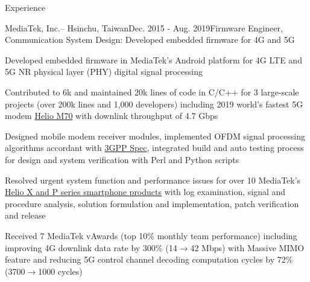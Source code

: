 \documentclass{resume} %
\begin{document}
\begin{rSection}{Experience}
\begin{rSubsection}{MediaTek, Inc.}{--  Hsinchu, Taiwan}{Dec. 2015 - Aug. 2019}{Firmware Engineer, Communication System Design: Developed embedded firmware for 4G and 5G}
\item Developed embedded firmware in MediaTek’s Android platform for 4G LTE and 5G NR physical layer (PHY) digital signal processing
\item Contributed to 6k and maintained 20k lines of code in C/C++ for 3 large-scale projects (over 200k lines and 1,000 developers) including 2019 world’s fastest 5G modem  \href{https://www.mediatek.com/blog/heres-5gs-real-speed-live-connection-demo
}{Helio M70} with downlink throughput of 4.7 Gbps
\item Designed mobile modem receiver modules, implemented OFDM signal processing algorithms accordant with  \href{https://www.3gpp.org/specifications}{3GPP Spec}, integrated build and auto testing process for design and system verification with Perl and Python scripts 
\item Resolved urgent system function and performance issues for over 10 MediaTek’s \href{https://www.mediatek.com/products/smartphones}{Helio X and P series smartphone products} with log examination, signal and procedure analysis, solution formulation and implementation, patch verification and release

\item Received 7 MediaTek vAwards (top 10\% monthly team performance) including  improving 4G downlink data rate by 300\% (14$\rightarrow$42 Mbps) with Massive MIMO feature and reducing 5G control channel decoding computation  cycles by 72\% (3700$\rightarrow$1000 cycles)

\end{rSubsection}

\end{rSection}

\end{document}
